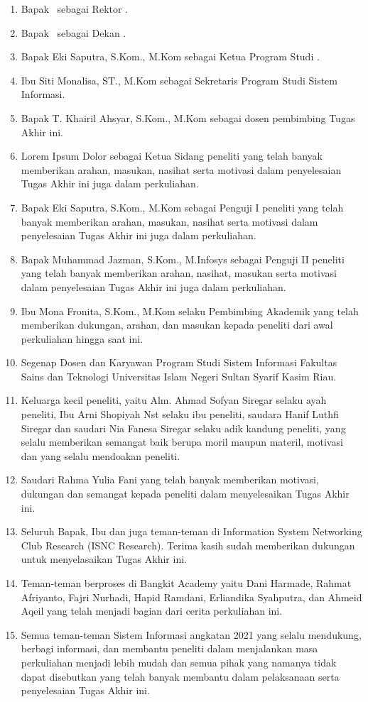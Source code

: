 \begin{enumerate}
	\item Bapak \rektor\  sebagai Rektor \universitas.
	\item Bapak \dekan\ sebagai Dekan \fakultas.
	\item Bapak Eki Saputra, S.Kom., M.Kom sebagai Ketua Program Studi \programStudi.
	\item Ibu Siti Monalisa, ST., M.Kom sebagai Sekretaris Program Studi Sistem Informasi.
	\item Bapak T. Khairil Ahsyar, S.Kom., M.Kom sebagai dosen pembimbing Tugas Akhir ini.
	\item Lorem Ipsum Dolor sebagai Ketua Sidang peneliti yang telah banyak memberikan arahan, masukan, nasihat serta motivasi dalam penyelesaian Tugas Akhir ini juga dalam perkuliahan.
	\item Bapak Eki Saputra, S.Kom., M.Kom sebagai Penguji I peneliti yang telah banyak memberikan arahan, masukan, nasihat serta motivasi dalam penyelesaian Tugas Akhir ini juga dalam perkuliahan.
	\item Bapak Muhammad Jazman, S.Kom., M.Infosys sebagai Penguji II peneliti yang telah banyak memberikan arahan, nasihat, masukan serta motivasi dalam penyelesaian Tugas Akhir ini juga dalam perkuliahan.
	\item Ibu Mona Fronita, S.Kom., M.Kom selaku Pembimbing Akademik yang telah memberikan dukungan, arahan, dan masukan kepada peneliti dari awal perkuliahan hingga saat ini.
	\item Segenap Dosen dan Karyawan Program Studi Sistem Informasi Fakultas Sains dan Teknologi Universitas Islam Negeri Sultan Syarif Kasim Riau.
	\item Keluarga kecil peneliti, yaitu Alm. Ahmad Sofyan Siregar selaku ayah peneliti, Ibu Arni Shopiyah Nst selaku ibu peneliti, saudara Hanif Luthfi Siregar dan saudari Nia Fanesa Siregar selaku adik kandung peneliti, yang selalu memberikan semangat baik berupa moril maupun materil, motivasi dan yang selalu mendoakan peneliti.
	\item Saudari Rahma Yulia Fani yang telah banyak memberikan motivasi, dukungan dan semangat kepada peneliti dalam menyelesaikan Tugas Akhir ini.
	\item Seluruh Bapak, Ibu dan juga teman-teman di Information System Networking Club Research (ISNC Research). Terima kasih sudah memberikan dukungan untuk menyelasaikan Tugas Akhir ini.
	\item Teman-teman berproses di Bangkit Academy yaitu Dani Harmade, Rahmat Afriyanto, Fajri Nurhadi, Hapid Ramdani, Erliandika Syahputra, dan Ahmeid Aqeil yang telah menjadi bagian dari cerita perkuliahan ini.
	\item Semua teman-teman Sistem Informasi angkatan 2021 yang selalu mendukung, berbagi informasi, dan membantu peneliti dalam menjalankan masa perkuliahan menjadi lebih mudah dan semua pihak yang namanya tidak dapat disebutkan yang telah banyak membantu dalam pelaksanaan serta penyelesaian Tugas Akhir ini.
\end{enumerate}

